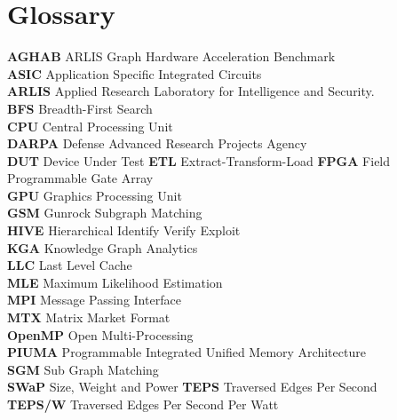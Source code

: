 \section{Glossary}
\small{
\textbf{AGHAB} ARLIS Graph Hardware Acceleration Benchmark \\
\textbf{ASIC} Application Specific Integrated Circuits \\
\textbf{ARLIS} Applied Research Laboratory for Intelligence and Security.\\ 
\textbf{BFS} Breadth-First Search \\
\textbf{CPU} Central Processing Unit \\
\textbf{DARPA} Defense Advanced Research Projects Agency \\ 
\textbf{DUT} Device Under Test
\textbf{ETL} Extract-Transform-Load
\textbf{FPGA} Field Programmable Gate Array \\
\textbf{GPU} Graphics Processing Unit \\
\textbf{GSM} Gunrock Subgraph Matching \\
\textbf{HIVE} Hierarchical Identify Verify Exploit \\
\textbf{KGA} Knowledge Graph Analytics \\
\textbf{LLC} Last Level Cache \\ 
\textbf{MLE} Maximum Likelihood Estimation \\
\textbf{MPI} Message Passing Interface \\
\textbf{MTX} Matrix Market Format \\ 
\textbf{OpenMP} Open Multi-Processing \\
\textbf{PIUMA} Programmable Integrated Unified Memory Architecture \\ 
\textbf{SGM} Sub Graph Matching \\
\textbf{SWaP} Size, Weight and Power
\textbf{TEPS} Traversed Edges Per Second \\
\textbf{TEPS/W} Traversed Edges Per Second Per Watt
}